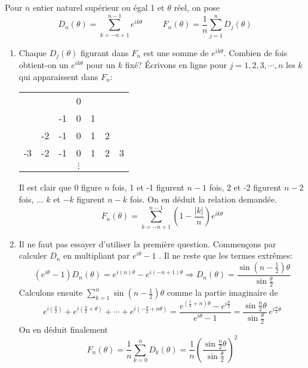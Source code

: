 Pour $n$ entier naturel sup{\'e}rieur ou {\'e}gal 1 et $\theta$
r{\'e}el, on pose
\begin{displaymath}
  D_n(\theta)=\sum_{k=-n+1}^{n-1}e^{ik\theta}\hspace{1cm}
  F_n(\theta)=\frac{1}{n}\sum_{j=1}^n D_j(\theta)
\end{displaymath}

\begin{enumerate}
  \item   Chaque $D_j(\theta)$ figurant dans $F_n$ est une somme de $e^{ik\theta}$. Combien de fois obtient-on un $e^{ik\theta}$ pour un $k$ fixé?\newline
  {\'E}crivons en ligne pour $j= 1, 2, 3, \cdots, n$ les $k$ qui apparaissent dans $F_n$:
\begin{center}
\begin{tabular}{ccccccc}
   &    &    & 0        &   &   &   \\
   &    & -1 & 0        & 1 &   &   \\
   & -2 & -1 & 0        & 1 & 2 &   \\
-3 & -2 & -1 & 0        & 1 & 2 & 3 \\
   &    &    & $\vdots$ &   &   & 
\end{tabular}
\end{center}
Il est clair que 0 figure $n$ fois,  1 et -1 figurent $n-1$ fois, 2 et -2 figurent $n-2$ fois, ... $k$ et $-k$ figurent $n-k$ fois. On en d{\'e}duit la relation demand{\'e}e.
\begin{displaymath}
  F_n(\theta)=\sum_{k=-n+1}^{n-1}(1-\frac{|k|}{n})e^{ik\theta}
\end{displaymath}

  \item Il ne faut pas essayer d'utiliser la premi{\`e}re question. Commen\c{c}ons par calculer $D_n$ en multipliant par $e^{i\theta}-1$ . Il ne reste que les termes extrêmes:
\begin{displaymath}
  (e^{i\theta}-1)D_n(\theta)=e^{i(n)\theta}-e^{i(-n+1)\theta}
  \Rightarrow 
  D_n(\theta)=\frac{\sin(n-\frac{1}{2})\theta}{\sin \frac{\theta}{2}}
\end{displaymath}
Calculons ensuite $\sum_{k=1}^{n}\sin(n-\frac{1}{2})\theta$ comme la partie imaginaire de
\begin{displaymath}
e^{i(\frac{\theta}{2})}+e^{i(\frac{\theta}{2}+\theta)}+ \cdots + e^{i(-\frac{\theta}{2}+n\theta)}
= \frac{e^{(\frac{1}{2}+n)\theta}-e^{i\frac{\theta}{2}}}{e^{i\theta}-1} 
= \frac{\sin \frac{n}{2}\theta}{\sin\frac{\theta}{2}}\,e^{i\frac{n}{2}\theta}
\end{displaymath}
On en d{\'e}duit finalement
\begin{displaymath}
  F_n (\theta)=\frac{1}{n}\sum_{k=0}^n D_k(\theta)=\frac{1}{n}\left(\frac{\sin\frac{n}{2}\theta}{\sin\frac{\theta}{2}}\right)^2
\end{displaymath}
\end{enumerate}
